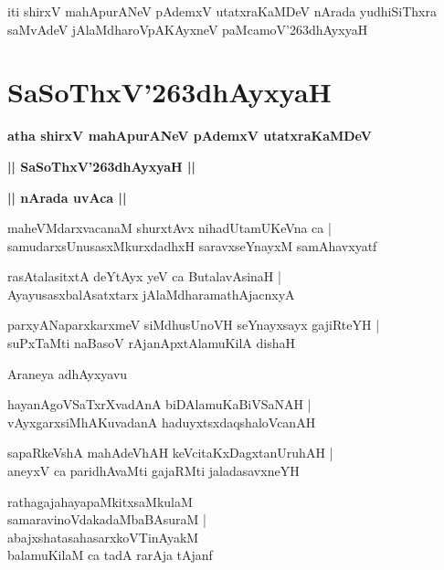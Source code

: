 \documentclass[twoside,12pt,openright]{book}
\def\S{\char'263}
\newcounter{shloka}[chapter]
\def\uvaca#1{\centerline{{\large\textbf{#1}}}}
\begin{document}
\begin{center}
iti shirxV mahApurANeV pAdemxV utatxraKaMDeV nArada yudhiSiThxra saMvAdeV jAlaMdharoVpAKAyxneV 
paMcamoV\S dhAyxyaH 
\end{center}

\chapter{SaSoThxV\S dhAyxyaH}

\begin{center}
{\LARGE\bfseries atha shirxV mahApurANeV pAdemxV utatxraKaMDeV} 
\end{center}

\begin{center}
{\LARGE\bfseries  || SaSoThxV\S dhAyxyaH ||}
\end{center}

\uvaca{|| nArada uvAca ||}

\begin{shloka}%
maheVMdarxvacanaM shurxtAvx nihadUtamUKeVna ca |\\
samudarxsUnusasxMkurxdadhxH saravxseYnayxM samAhavxyatf 
\end{shloka}

\begin{shloka}%
rasAtalasitxtA deYtAyx yeV ca ButalavAsinaH |\\
AyayusasxbalAsatxtarx jAlaMdharamathAjacnxyA
\end{shloka}

\begin{shloka}%
parxyANaparxkarxmeV siMdhusUnoVH seYnayxsayx gajiRteYH |\\
suPxTaMti naBasoV rAjanApxtAlamuKilA dishaH
\end{shloka}

\begin{center}
Araneya adhAyxyavu
\end{center}

\begin{shloka}%
hayanAgoVSaTxrXvadAnA biDAlamuKaBiVSaNAH |\\
vAyxgarxsiMhAKuvadanA haduyxtsxdaqshaloVcanAH 
\end{shloka}

\begin{shloka}%
sapaRkeVshA mahAdeVhAH keVcitaKxDagxtanUruhAH |\\
aneyxV ca paridhAvaMti gajaRMti jaladasavxneYH
\end{shloka}

\begin{shloka}%
rathagajahayapaMkitxsaMkulaM \\
samaravinoVdakadaMbaBAsuraM |\\
abajxshatasahasarxkoVTinAyakM\\
balamuKilaM ca tadA rarAja tAjanf
\end{shloka}
\end{document}
